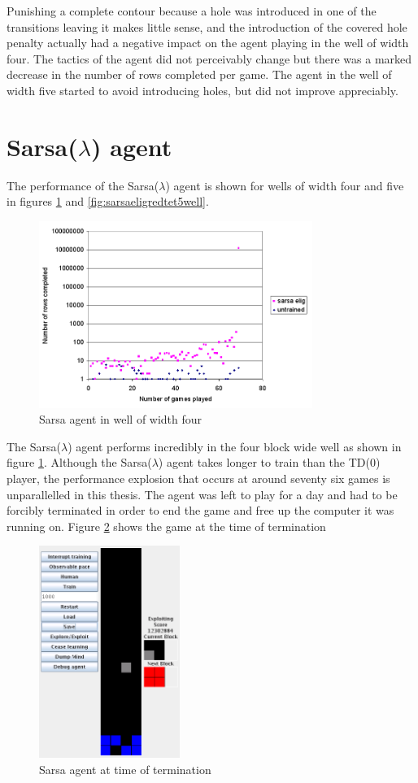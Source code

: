 \documentclass{rucsthesis}
\begin{document}
Punishing a complete contour because a hole was introduced in one of the transitions leaving it makes little sense, and the introduction of the covered hole penalty actually had a negative impact on the agent playing in the well of width four. The tactics of the agent did not perceivably change but there was a marked decrease in the number of rows completed per game. The agent in the well of width five started to avoid introducing holes, but did not improve appreciably.

\section{Sarsa($\lambda$) agent}

The performance of the Sarsa($\lambda$) agent is shown for wells of width four and five in figures \ref{fig:sarsaeligredtet4well} and \ref{fig:sarsaeligredtet5well}.

\begin{figure}[h]
\centering
\includegraphics[width=3.5in]{sarsaeligredtet4well.png}
\caption{Sarsa agent in well of width four}
\label{fig:sarsaeligredtet4well}
\end{figure}

The Sarsa($\lambda$) agent performs incredibly in the four block wide well as shown in figure \ref{fig:sarsaeligredtet4well}. Although the Sarsa($\lambda$) agent takes longer to train than the TD(0) player, the performance explosion that occurs at around seventy six games is unparallelled in this thesis. The agent was left to play for a day and had to be forcibly terminated in order to end the game and free up the computer it was running on. Figure \ref{fig:sarsaelig4term} shows the game at the time of termination 

\begin{figure}[h]
\centering
\includegraphics[width=1.8in]{sarsaelig4term.png}
\caption{Sarsa agent at time of termination}
\label{fig:sarsaelig4term}
\end{figure}
\end{document}
